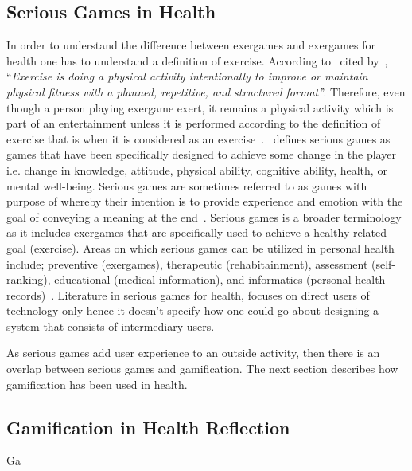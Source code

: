 \subsection{Serious Games in Health}
In order to understand the difference between exergames and exergames for health one has to understand a definition of exercise. According to~\cite[p. 126]{caspersen1985physical} cited by~\cite{oh2010defining}, ``\emph{Exercise is doing a physical activity intentionally to improve or maintain physical fitness with a planned, repetitive, and structured format'}'. Therefore, even though a person playing exergame exert, it remains a physical activity which is part of an entertainment unless it is performed according to the definition of exercise that is when it is considered as an exercise~\citep{oh2010defining}.~\cite{mccallum2012gamification} defines serious games as games that have been specifically designed to achieve some change in the player i.e. change in knowledge, attitude, physical ability, cognitive ability, health, or mental well-being. Serious games are sometimes referred to as games with purpose of  whereby their intention is to provide experience and emotion with the goal of conveying a meaning at the end~\citep{marsh2011serious}. Serious games is a broader terminology as it includes exergames that are specifically used to achieve a healthy related goal (exercise). Areas on which serious games can be utilized in personal health include; preventive (exergames), therapeutic (rehabitainment), assessment (self-ranking), educational (medical information), and informatics (personal health records)~\citep{mccallum2012gamification}. Literature in serious games for health, focuses on direct users of technology only hence it doesn't specify how one could go about designing a system that consists of intermediary users.

As serious games add user experience to an outside  activity, then there is an overlap between serious games and gamification. The next section describes how gamification has been used in health.   

\subsection{Gamification in Health Reflection}
Ga
\begin{flushright}
\end{flushright}
